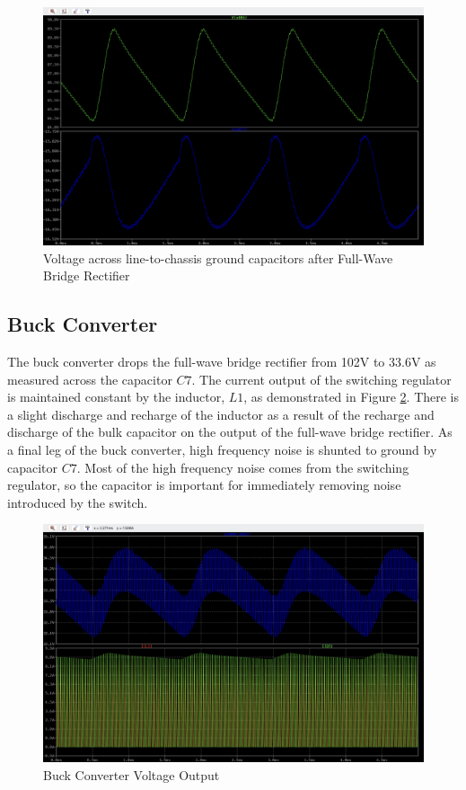 \documentclass[conference]{IEEEtran}
\begin{document}
\begin{figure}[htp]
    \centering
    \includegraphics[width=1.0\linewidth]{full_wave_bridge_rectifier_chassis_caps_waveform.png}
    \caption{Voltage across line-to-chassis ground capacitors after Full-Wave Bridge Rectifier}
    \label{fig:full_wave_bridge_rectifier_chassis_caps_waveform}
\end{figure}

\subsection{Buck Converter}

The buck converter drops the full-wave bridge rectifier from 102V to 33.6V as measured across the capacitor $C7$. The current output of the switching regulator is maintained constant by the inductor, $L1$, as demonstrated in Figure \ref{fig:buck_converter_lc_filter_waveforms}. There is a slight discharge and recharge of the inductor as a result of the recharge and discharge of the bulk capacitor on the output of the full-wave bridge rectifier. As a final leg of the buck converter, high frequency noise is shunted to ground by capacitor $C7$. Most of the high frequency noise comes from the switching regulator, so the capacitor is important for immediately removing noise introduced by the switch.

\begin{figure}[htp]
    \centering
    \includegraphics[width=1.0\linewidth]{buck_converter_lc_filter_waveforms.png}
    \caption{Buck Converter Voltage Output}
    \label{fig:buck_converter_lc_filter_waveforms}
\end{figure}
\end{document}
